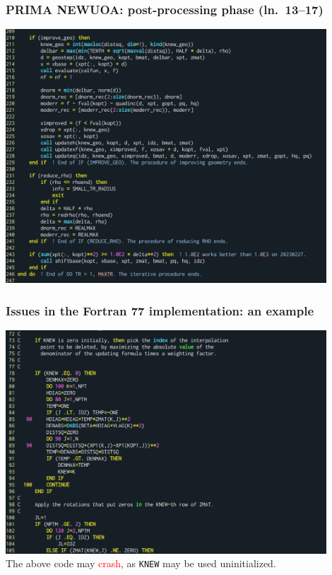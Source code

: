 \documentclass[slidestop,mathserif,xcolor=dvipsnames]{beamer}
\newcommand{\red}[1]{\textcolor{red}{#1}}
\begin{document}
\begin{frame}
    \frametitle{PRIMA NEWUOA: post-processing phase (ln.~13--17)}
    \vspace{-2ex}
    \begin{center}
        \includegraphics[width=0.9\textwidth]{newuoa_post.png}
    \end{center}
\end{frame}

\begin{frame}
    \frametitle{Issues in the Fortran 77 implementation: an example}
    \vspace{-1ex}
    \begin{center}
        \includegraphics[width=0.9\textwidth]{lincoa_knew.png}
        \\[0.2ex]The above code may \red{crash}, as \texttt{KNEW} may be used uninitialized.
    \end{center}
\end{frame}
\end{document}
